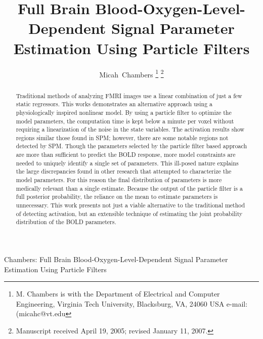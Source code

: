 \documentclass[journal]{./IEEEtran}
\begin{document}
\title{Full Brain Blood-Oxygen-Level-Dependent Signal Parameter Estimation Using Particle Filters}

\author{{Micah~Chambers}%
\thanks{M. Chambers is with the Department
of Electrical and Computer Engineering, Virginia Tech University, Blacksburg,
VA, 24060 USA e-mail: (micahc@vt.edu}%
\thanks{Manuscript received April 19, 2005; revised January 11, 2007.}}

%
{Chambers: Full Brain Blood-Oxygen-Level-Dependent Signal Parameter Estimation Using Particle Filters}
% 

\maketitle

\begin{abstract}
Traditional methods of analyzing FMRI images use a linear combination of
just a few static regressors. This works demonstrates an alternative
approach using a physiologically inspired nonlinear model. By using a 
particle filter to optimize the model parameters, the computation time
is kept below a minute per voxel without requiring a linearization 
of the noise in the state
variables. The activation results show regions similar those found in 
SPM; however, there are some notable regions not detected by 
SPM. Though the parameters selected by the particle filter based approach
are more than sufficient to predict the BOLD response,
more model constraints are needed to uniquely identify a single set
of parameters. This ill-posed nature explains the large discrepancies
found in other research that attempted to characterize the model parameters.
For this reason the final distribution of parameters is more medically relevant
than a single estimate. Because the output of the particle filter is 
a full posterior probability, the reliance on the mean to estimate 
parameters is unnecessary. This work presents
not just a viable alternative to the traditional method of detecting
activation, but an extensible technique of estimating the joint probability
distribution of the BOLD parameters.
\end{abstract}
\end{document}
